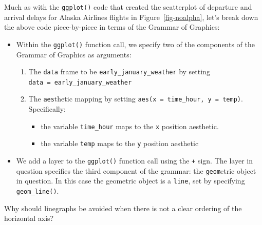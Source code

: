 \documentclass[
  letterpaper,
  DIV=11,
  numbers=noendperiod]{scrreprt}
\providecommand{\tightlist}{%
  \setlength{\itemsep}{0pt}\setlength{\parskip}{0pt}}\usepackage{longtable,booktabs,array}
\theoremstyle{definition}
\theoremstyle{remark}
\begin{document}
Much as with the \texttt{ggplot()} code that created the scatterplot of
departure and arrival delays for Alaska Airlines flights in
Figure~\ref{fig-noalpha}, let's break down the above code piece-by-piece
in terms of the Grammar of Graphics:

\begin{itemize}
\tightlist
\item
  Within the \texttt{ggplot()} function call, we specify two of the
  components of the Grammar of Graphics as arguments:

  \begin{enumerate}
  \def\labelenumi{\arabic{enumi}.}
  \tightlist
  \item
    The \texttt{data} frame to be \texttt{early\_january\_weather} by
    setting \texttt{data\ =\ early\_january\_weather}
  \item
    The \texttt{aes}thetic mapping by setting
    \texttt{aes(x\ =\ time\_hour,\ y\ =\ temp)}. Specifically:

    \begin{itemize}
    \tightlist
    \item
      the variable \texttt{time\_hour} maps to the \texttt{x} position
      aesthetic.
    \item
      the variable \texttt{temp} maps to the \texttt{y} position
      aesthetic
    \end{itemize}
  \end{enumerate}
\item
  We add a layer to the \texttt{ggplot()} function call using the
  \texttt{+} sign. The layer in question specifies the third component
  of the grammar: the \texttt{geom}etric object in question. In this
  case the geometric object is a \texttt{line}, set by specifying
  \texttt{geom\_line()}.
\end{itemize}

\begin{tcolorbox}[enhanced jigsaw, colback=white, toprule=.15mm, bottomrule=.15mm, titlerule=0mm, title={{🎯} Learning Check 2.11}, leftrule=.75mm, arc=.35mm, left=2mm, colframe=quarto-callout-tip-color-frame, coltitle=black, opacitybacktitle=0.6, bottomtitle=1mm, colbacktitle=quarto-callout-tip-color!10!white, opacityback=0, toptitle=1mm, rightrule=.15mm, breakable]

Why should linegraphs be avoided when there is not a clear ordering of
the horizontal axis?

\end{tcolorbox}
\end{document}

